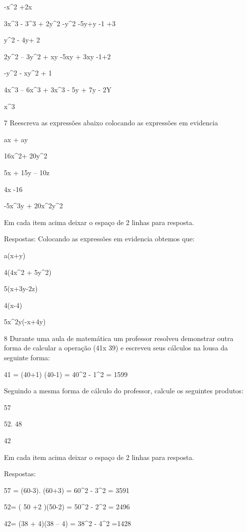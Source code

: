 -x^2 +2x

\item 3x^3 - 3^3 + 2y^2 -y^2 -5y+y -1 +3

y^2 - 4y+ 2

\item 2y^2 -- 3y^2 + xy -5xy + 3xy -1+2

-y^2 - xy^2 + 1

\item 4x^3 -- 6x^3 + 3x^3 - 5y + 7y - 2Y

x^3

\num{7} Reescreva as expressões abaixo colocando as expressões em evidencia

\item ax + ay
\item 16x^2+ 20y^2
\item 5x + 15y -- 10z
\item 4x -16
\item -5x^3y + 20x^2y^2

Em cada item acima deixar o espaço de 2 linhas para resposta.

Respostas: Colocando as expressões em evidencia obtemos que:

\item a(x+y)
\item 4(4x^2 + 5y^2)
\item 5(x+3y-2z)
\item 4(x-4)
\item 5x^2y(-x+4y)

\num{8} Durante uma aula de matemática um professor resolveu demonstrar outra
forma de calcular a operação (41x 39) e escreveu seus cálculos na lousa
da seguinte forma:

41 = (40+1) (40-1) = 40^2 - 1^2 = 1599

Seguindo a mesma forma de cálculo do professor, calcule os seguintes
produtos:

\item 57
\item 52. 48
\item 42

Em cada item acima deixar o espaço de 2 linhas para resposta.

Respostas:

\item 57 = (60-3). (60+3) = 60^2 - 3^2 = 3591
\item 52= ( 50 +2 )\times (50-2) = 50^2 - 2^2 = 2496
\item 42= (38 + 4)\times (38 -- 4) = 38^2 - 4^2 =1428

